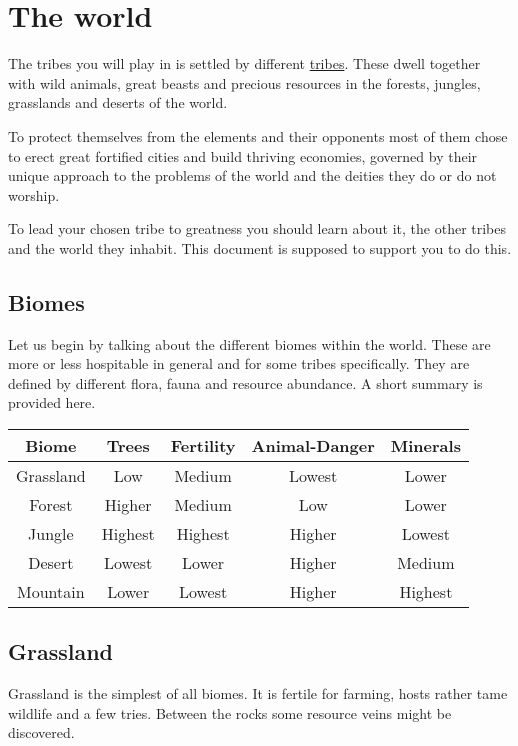 \chapter{The world}

The tribes you will play in is settled by different
\hyperref[ch:Tribes]{tribes}. These dwell together with wild animals, great
beasts and precious resources in the forests, jungles, grasslands and deserts
of the world.

To protect themselves from the elements and their opponents most of them chose
to erect great fortified cities and build thriving economies, governed by their
unique approach to the problems of the world and the deities they do or do not
worship.

To lead your chosen tribe to greatness you should learn about it, the other
tribes and the world they inhabit. This document is supposed to support you to
do this.

\section{Biomes}\label{sec:biomes}
Let us begin by talking about the different biomes within the world. These are
more or less hospitable in general and for some tribes specifically. They are
defined by different flora, fauna and resource abundance. A short summary is
provided here.

\begin{longtable}{cc ccc}
	\toprule
	Biome     & Trees   & Fertility & Animal-Danger & Minerals \\
	\midrule
	Grassland & Low     & Medium    & Lowest        & Lower    \\
	Forest    & Higher  & Medium    & Low           & Lower    \\
	Jungle    & Highest & Highest   & Higher        & Lowest   \\
	Desert    & Lowest  & Lower     & Higher        & Medium   \\
	Mountain  & Lower   & Lowest    & Higher        & Highest  \\
	\bottomrule
\end{longtable}

\section{Grassland}
Grassland is the simplest of all biomes. It is fertile for farming, hosts
rather tame wildlife and a few tries. Between the rocks some resource veins
might be discovered.

